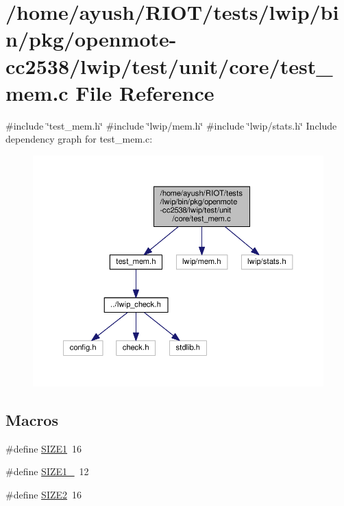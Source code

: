 \hypertarget{openmote-cc2538_2lwip_2test_2unit_2core_2test__mem_8c}{}\section{/home/ayush/\+R\+I\+O\+T/tests/lwip/bin/pkg/openmote-\/cc2538/lwip/test/unit/core/test\+\_\+mem.c File Reference}
\label{openmote-cc2538_2lwip_2test_2unit_2core_2test__mem_8c}
{\ttfamily \#include \char`\"{}test\+\_\+mem.\+h\char`\"{}}\newline
{\ttfamily \#include \char`\"{}lwip/mem.\+h\char`\"{}}\newline
{\ttfamily \#include \char`\"{}lwip/stats.\+h\char`\"{}}\newline
Include dependency graph for test\+\_\+mem.\+c\+:
\nopagebreak
\begin{figure}[H]
\begin{center}
\leavevmode
\includegraphics[width=350pt]{openmote-cc2538_2lwip_2test_2unit_2core_2test__mem_8c__incl}
\end{center}
\end{figure}
\subsection*{Macros}
\begin{DoxyCompactItemize}
\item 
\#define \hyperlink{openmote-cc2538_2lwip_2test_2unit_2core_2test__mem_8c_a68d34399b41feca1830f2ad3bf471e86}{S\+I\+Z\+E1}~16
\item 
\#define \hyperlink{openmote-cc2538_2lwip_2test_2unit_2core_2test__mem_8c_abb242441e277d6aa30dc9d9b8b7c8fa2}{S\+I\+Z\+E1\+\_}~12
\item 
\#define \hyperlink{openmote-cc2538_2lwip_2test_2unit_2core_2test__mem_8c_a52e67c20715e5017fad111d424d11486}{S\+I\+Z\+E2}~16
\end{DoxyCompactItemize}
